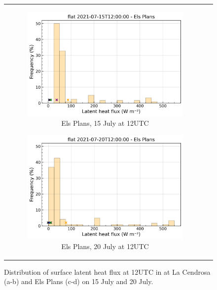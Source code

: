 \begin{figure}[hbtp]
{\begin{tabular}{cc}
\begin{subfigure}[t]{0.48\textwidth}
            \caption{Els Plans, 15 July at 12UTC}
            \includegraphics[width=\textwidth]{images/chap5/IOP_bins/bins_flat_2021-07-15T12:00:00_elsplans.png}
        \end{subfigure}
        \begin{subfigure}[t]{0.48\textwidth}
            \caption{Els Plans, 20 July at 12UTC}
            \includegraphics[width=\textwidth]{images/chap5/IOP_bins/bins_flat_2021-07-20T12:00:00_elsplans.png}
        \end{subfigure}
    \end{tabular}
    }
    \caption{Distribution of surface latent heat flux at 12UTC in \mesomean at La Cendrosa (a-b) and Els Plans (c-d) on 15 July and 20 July.}
    \label{fig:flat_bins}
\end{figure}

